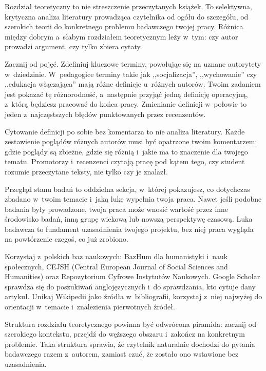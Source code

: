 \documentclass[11pt,a5paper,twoside,openany]{book}
\begin{document}
Rozdział teoretyczny to nie streszczenie przeczytanych książek. To selektywna, krytyczna analiza literatury prowadząca czytelnika od ogółu do szczegółu, od szerokich teorii do konkretnego problemu badawczego twojej pracy. Różnica między dobrym a~słabym rozdziałem teoretycznym leży w~tym: czy autor prowadzi argument, czy tylko zbiera cytaty.

Zacznij od pojęć. Zdefiniuj kluczowe terminy, powołując się na uznane autorytety w~dziedzinie. W~pedagogice terminy takie jak ,,socjalizacja'', ,,wychowanie'' czy ,,edukacja włączająca'' mają różne definicje u~różnych autorów. Twoim zadaniem jest pokazać tę różnorodność, a~następnie przyjąć jedną definicję operacyjną, z~którą będziesz pracować do końca pracy. Zmienianie definicji w~połowie to jeden z~najczęstszych błędów punktowanych przez recenzentów.

\begin{warningbox}
Cytowanie definicji po sobie bez komentarza to nie analiza literatury. Każde zestawienie poglądów różnych autorów musi być opatrzone twoim komentarzem: gdzie poglądy są zbieżne, gdzie się różnią i~jakie ma to znaczenie dla twojego tematu. Promotorzy i~recenzenci czytają pracę pod kątem tego, czy student rozumie przeczytane teksty, nie tylko czy je znalazł.
\end{warningbox}

Przegląd stanu badań to oddzielna sekcja, w~której pokazujesz, co dotychczas zbadano w~twoim temacie i~jaką lukę wypełnia twoja praca. Nawet jeśli podobne badania były prowadzone, twoja praca może wnosić wartość przez inne środowisko badań, inną grupę wiekową lub nowszą perspektywę czasową. Luka badawcza to fundament uzasadnienia twojego projektu, bez niej praca wygląda na powtórzenie czegoś, co już zrobiono.

\begin{tipbox}
Korzystaj z~polskich baz naukowych: BazHum dla humanistyki i~nauk społecznych, CEJSH (Central European Journal of Social Sciences and Humanities) oraz Repozytorium Cyfrowe Instytutów Naukowych. Google Scholar sprawdza się do poszukiwań anglojęzycznych i~do sprawdzania, kto cytuje dany artykuł. Unikaj Wikipedii jako źródła w~bibliografii, korzystaj z~niej najwyżej do orientacji w~temacie i~znalezienia pierwotnych źródeł.
\end{tipbox}

Struktura rozdziału teoretycznego powinna być odwrócona piramida: zacznij od szerokiego kontekstu, przejdź do węższego obszaru i~zakończ na konkretnym problemie. Taka struktura sprawia, że czytelnik naturalnie dochodzi do pytania badawczego razem z~autorem, zamiast czuć, że zostało ono wstawione bez uzasadnienia.
\end{document}
